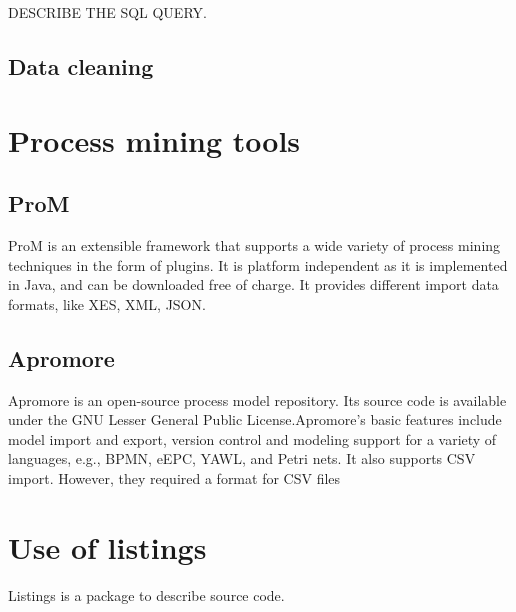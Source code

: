 DESCRIBE THE SQL QUERY.

\subsection{Data cleaning}

\section{Process mining tools}
\subsection{ProM}
ProM is an extensible framework that supports a wide variety of process mining techniques in the form of plugins. 
It is platform independent as it is implemented in Java, and can be downloaded free of charge. It provides different import data formats, like XES, XML, JSON.
\subsection{Apromore}
Apromore is an open-source process model repository. Its source code is available under the GNU Lesser General Public License.Apromore’s basic features include model import and export, version control and modeling support for a variety of languages, e.g., BPMN,
eEPC, YAWL, and Petri nets. It also supports CSV import. However, they required a format for CSV files 

\section{Use of listings}

Listings is a package to describe source code.

